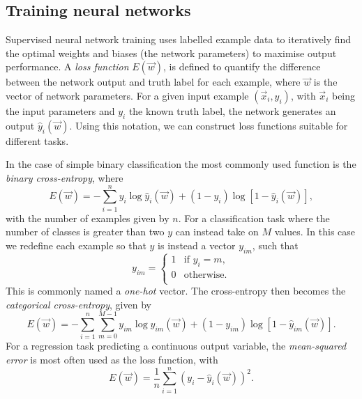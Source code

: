 \subsection{Training neural networks} %
\label{sec:cnn_theory_training} %

Supervised neural network training uses labelled example data to iteratively find the optimal
weights and biases (the network parameters) to maximise output performance. A \emph{loss function}
$E(\vec{w})$, is defined to quantify the difference between the network output and truth label for
each example, where $\vec{w}$ is the vector of network parameters. For a given input example
$(\vec{x}_{i}, y_{i})$, with $\vec{x}_{i}$ being the input parameters and $y_{i}$ the known truth
label, the network generates an output $\hat{y}_{i}(\vec{w})$. Using this notation, we can
construct loss functions suitable for different tasks.

In the case of simple binary classification the most commonly used function is the \emph{binary
cross-entropy}, where
\begin{equation} %
    E(\vec{w})=
    -\displaystyle\sum_{i=1}^{n}y_{i}\log\hat{y}_{i}(\vec{w})+
    (1-y_{i})\log[1-\hat{y}_{i}(\vec{w})],
    \label{eq:binary_cross_entropy}
\end{equation}
with the number of examples given by $n$. For a classification task where the number of classes is
greater than two $y$ can instead take on $M$ values. In this case we redefine each example so that
$y$ is instead a vector $y_{im}$, such that
\begin{equation} %
    y_{im}=
    \begin{cases}
        1 & \text{if $y_{i}=m$,} \\
        0 & \text{otherwise.}   \\
    \end{cases}
\end{equation}
This is commonly named a \emph{one-hot} vector. The cross-entropy then becomes the
\emph{categorical cross-entropy}, given by
\begin{equation} %
    E(\vec{w})=
    -\displaystyle\sum_{i=1}^{n}\displaystyle\sum_{m=0}^{M-1}y_{im}\log\hat{y}_{im}
    (\vec{w})+(1-y_{im})\log[1-\hat{y}_{im}(\vec{w})].
    \label{eq:categorical_cross_entropy}
\end{equation}
For a regression task predicting a continuous output variable, the \emph{mean-squared error} is
most often used as the loss function, with
\begin{equation} %
    E(\vec{w})=
    \frac{1}{n}\displaystyle\sum_{i=1}^{n}(y_{i}-
    \hat{y}_{i}(\vec{w}))^{2}.
    \label{eq:mse}
\end{equation}

